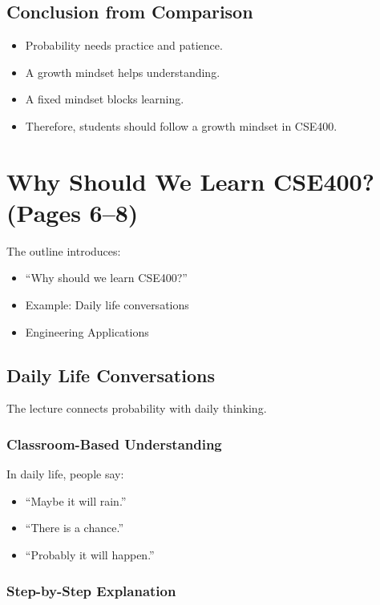 \documentclass[12pt]{article}
\begin{document}
\subsection{Conclusion from Comparison}

\begin{itemize}
\item Probability needs practice and patience.
\item A growth mindset helps understanding.
\item A fixed mindset blocks learning.
\item Therefore, students should follow a growth mindset in CSE400.
\end{itemize}

\section{Why Should We Learn CSE400? (Pages 6--8)}

The outline introduces:

\begin{itemize}
\item ``Why should we learn CSE400?''
\item Example: Daily life conversations
\item Engineering Applications
\end{itemize}

\subsection{Daily Life Conversations}

The lecture connects probability with daily thinking.

\subsubsection*{Classroom-Based Understanding}

In daily life, people say:

\begin{itemize}
\item ``Maybe it will rain.''
\item ``There is a chance.''
\item ``Probably it will happen.''
\end{itemize}

\subsubsection*{Step-by-Step Explanation}
\end{document}
